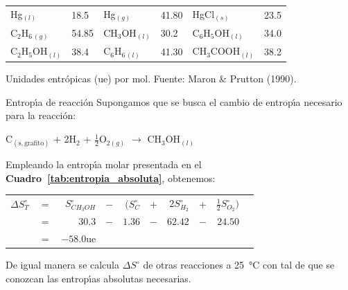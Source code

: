 \begin{table}[htb]
\begin{threeparttable}
{\begin{tabular}{ll ll ll}
        Hg$_{(l)}$                  & 18.5  &
        Hg$_{(g)}$                  & 41.80 &
        HgCl$_{(s)}$                & 23.5  \\

        C$_2$H$_{6\,(g)}$           & 54.85 &
        CH$_3$OH$_{(l)}$            & 30.2  &
        C$_6$H$_5$OH$_{(l)}$        & 34.0  \\

        C$_2$H$_5$OH$_{(l)}$        & 38.4  &
        C$_6$H$_{6\,(l)}$           & 41.30 &
        CH$_3$COOH$_{(l)}$          & 38.2  \\
        \bottomrule
    \end{tabular}
    }%

    \begin{tablenotes}[flushleft]   %
        \footnotesize               %
        \item[a] Unidades entr\'opicas (ue) por mol. Fuente: Maron \& Prutton (1990).
    \end{tablenotes}

\end{threeparttable}
\end{table}

\begin{ejemplo}{Entrop\'{\i}a de reacci\'on}
 Supongamos que se busca el cambio de entrop\'{\i}a necesario para la reacci\'on:
\begin{center}
C$_{(\mathrm{s,grafito})}$ + 2H$_2$ + $\frac{1}{2}$O$_{2(g)}$ $\longrightarrow$  CH$_3$OH$_{(l)}$
\end{center}
Empleando la entrop\'{\i}a molar presentada en el \textbf{Cuadro~\ref{tab:entropia_absoluta}}, obtenemos:

\begin{tabular}{rcrcrcrcrc}
$\Delta S^\circ _T$ &$=$&$S^\circ _{CH_3OH}$&$-$&$(S^\circ
_C$&$+$&$2S^\circ_{H_2}$&+&$\frac{1}{2} S^\circ_{O_2})$\\
&$=$ &$30.3$ & $-$& $1.36$ &$-$&$62.42$&$-$&$24.50$\\
&$=$ &$-58.0 $ue&&&&&&\\
\end{tabular}

De igual manera se calcula $\Delta S^\circ$ de otras reacciones a \SI{25}{\celsius} con tal de que
se conozcan las entrop\'{\i}as absolutas necesarias.
\end{ejemplo}

